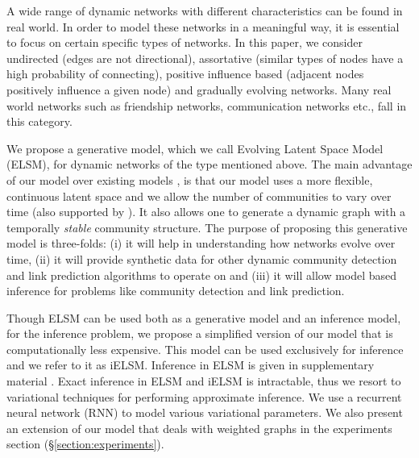\documentclass[letterpaper]{article}
\begin{document}
A wide range of dynamic networks with different characteristics can be found in real world. In order to model these networks in a meaningful way, it is essential to focus on certain specific types of networks. In this paper, we consider undirected (edges are not directional), assortative (similar types of nodes have a high probability of connecting), positive influence based (adjacent nodes positively influence a given node) and gradually evolving networks. Many real world networks such as friendship networks, communication networks etc., fall in this category.

We propose a generative model, which we call Evolving Latent Space Model (ELSM), for dynamic networks of the type mentioned above. The main advantage of our model over existing models \cite{XingEtAl:2010:AStateSpaceMixedMembershipBlockmodelForDynamicNetworkTomography,FouldsEtAl:2011:ADynamicRelationalInfiniteFeatureModelForLongitudinalSocialNetworks,HeaukulaniEtAl:2013:DynamicProbabilisticModelsForLatentFeaturePropagationInSocialNetworks,KimEtAl:2013:NonparametricMultiGroupMembershipModelForDynamicNetworks,XuHero:2014:DynamicStochasticBlockmodelsForTimeEvolvingSocialNetworks}, is that our model uses a more flexible, continuous latent space and we allow the number of communities to vary over time (also supported by \cite{KimEtAl:2013:NonparametricMultiGroupMembershipModelForDynamicNetworks}). It also allows one to generate a dynamic graph with a temporally \textit{stable} community structure. The purpose of proposing this generative model is three-folds: (i) it will help in understanding how networks evolve over time, (ii) it will provide synthetic data for other dynamic community detection and link prediction algorithms to operate on and (iii) it will allow model based inference for problems like community detection and link prediction.

Though ELSM can be used both as a generative model and an inference model, for the inference problem, we propose a simplified version of our model that is computationally less expensive. This model can be used exclusively for inference and we refer to it as iELSM. Inference in ELSM is given in supplementary material \cite{GuptaEtAl:2018:AGenerativeModelForDynamicNetworksWithApplicationsSupplementaryMaterial}. Exact inference in ELSM and iELSM is intractable, thus we resort to variational techniques for performing approximate inference. We use a recurrent neural network (RNN)  to model various variational parameters. We also present an extension of our model that deals with weighted graphs in the experiments section (\S \ref{section:experiments}).
\end{document}
